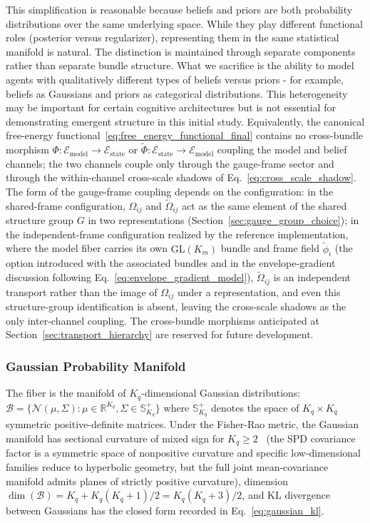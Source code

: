 \documentclass[11pt]{article}
\begin{document}
This simplification is reasonable because beliefs and priors are both probability distributions over the same underlying space. While they play different functional roles (posterior versus regularizer), representing them in the same statistical manifold is natural. The distinction is maintained through separate components rather than separate bundle structure. What we sacrifice is the ability to model agents with qualitatively different types of beliefs versus priors - for example, beliefs as Gaussians and priors as categorical distributions. This heterogeneity may be important for certain cognitive architectures but is not essential for demonstrating emergent structure in this initial study. Equivalently, the canonical free-energy functional~\eqref{eq:free_energy_functional_final} contains no cross-bundle morphism $\Phi: \mathcal{E}_{\mathrm{model}} \to \mathcal{E}_{\mathrm{state}}$ or $\tilde{\Phi}: \mathcal{E}_{\mathrm{state}} \to \mathcal{E}_{\mathrm{model}}$ coupling the model and belief channels; the two channels couple only through the gauge-frame sector and through the within-channel cross-scale shadows of Eq.~\eqref{eq:cross_scale_shadow}. The form of the gauge-frame coupling depends on the configuration: in the shared-frame configuration, $\Omega_{ij}$ and $\tilde{\Omega}_{ij}$ act as the same element of the shared structure group $G$ in two representations (Section~\ref{sec:gauge_group_choice}); in the independent-frame configuration realized by the reference implementation, where the model fiber carries its own $\mathrm{GL}(K_m)$ bundle and frame field $\tilde{\phi}_i$ (the option introduced with the associated bundles and in the envelope-gradient discussion following Eq.~\eqref{eq:envelope_gradient_model}), $\tilde{\Omega}_{ij}$ is an independent transport rather than the image of $\Omega_{ij}$ under a representation, and even this structure-group identification is absent, leaving the cross-scale shadows as the only inter-channel coupling. The cross-bundle morphisms anticipated at Section~\ref{sec:transport_hierarchy} are reserved for future development.

\subsubsection{Gaussian Probability Manifold}

The fiber is the manifold of $K_q$-dimensional Gaussian distributions: $\mathcal{B} = \{\mathcal{N}(\mu, \Sigma) : \mu \in \mathbb{R}^{K_q}, \Sigma \in \mathbb{S}^+_{K_q}\}$ where $\mathbb{S}^+_{K_q}$ denotes the space of $K_q \times K_q$ symmetric positive-definite matrices. Under the Fisher-Rao metric, the Gaussian manifold has sectional curvature of mixed sign for $K_q \geq 2$~\cite{Skovgaard1984} (the SPD covariance factor is a symmetric space of nonpositive curvature and specific low-dimensional families reduce to hyperbolic geometry, but the full joint mean-covariance manifold admits planes of strictly positive curvature), dimension $\dim(\mathcal{B}) = K_q + K_q(K_q+1)/2 = K_q(K_q+3)/2$, and KL divergence between Gaussians has the closed form recorded in Eq.~\eqref{eq:gaussian_kl}.
\end{document}
